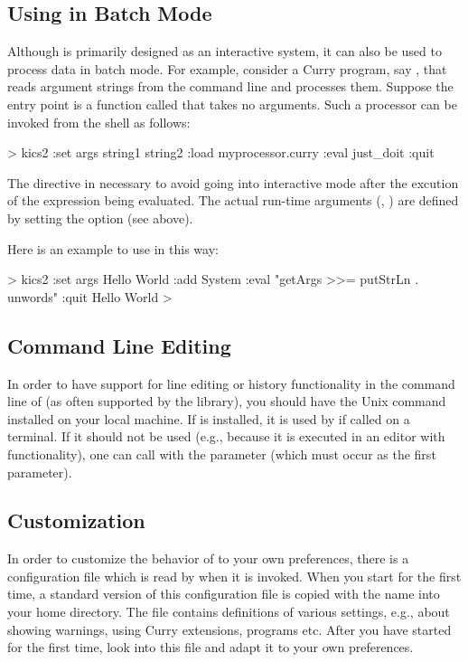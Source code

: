 \subsection{Using \CYS in Batch Mode}

Although \CYS is primarily designed as an interactive system,
it can also be used to process data in batch mode.
For example, consider a Curry program, say , that
reads argument strings from the command line and processes them.
Suppose the entry point is a function called 
that takes no arguments. Such a processor can be invoked from
the shell as follows:
\begin{curry}
> kics2 :set args string1 string2 :load myprocessor.curry :eval just_doit :quit
\end{curry}
The  directive in necessary to avoid \CYS going
into interactive mode after the
excution of the expression being evaluated.
The actual run-time arguments (, )
are defined by setting the option  (see above).

Here is an example to use \CYS in this way:
\begin{curry}
> kics2 :set args Hello World :add System :eval "getArgs >>= putStrLn . unwords" :quit
Hello World
>
\end{curry}


\subsection{Command Line Editing}

In order to have support for line editing or history functionality
in the command line of \CYS (as often supported by the 
library), you should have the Unix command  installed
on your local machine.
If  is installed, it is used by \CYS if called on a terminal.
If it should not be used (e.g., because it is executed
in an editor with  functionality), one can
call \CYS with the parameter 
(which must occur as the first parameter).


\subsection{Customization}
\label{sec-customization}

In order to customize the behavior of \CYS to your own preferences,
there is a configuration file which is read by \CYS when it is invoked.
When you start \CYS for the first time, a standard version of
this configuration file is copied with the name
into your home directory. The file contains definitions
of various settings, e.g., about showing warnings, using Curry extensions,
programs etc.
After you have started \CYS for the first time, look into this file
and adapt it to your own preferences.


